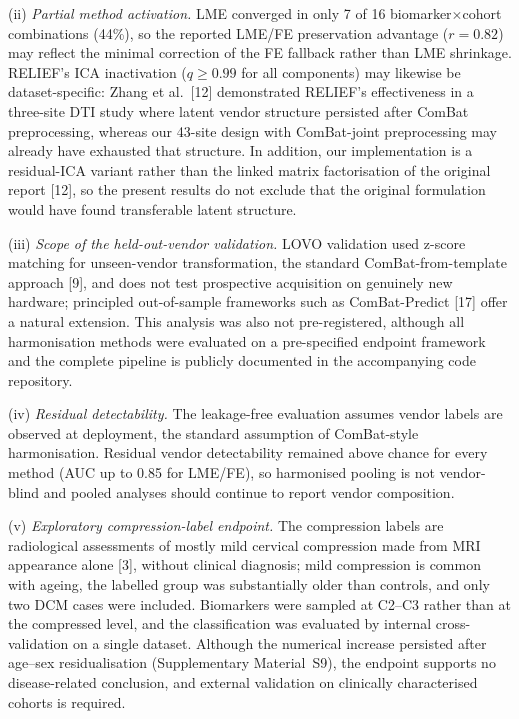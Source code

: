 \documentclass[12pt,a4paper]{article}
\begin{document}
(ii) \emph{Partial method activation.} LME converged in only 7 of 16 biomarker$\times$cohort combinations (44\%), so the reported LME/FE preservation advantage ($r=0.82$) may reflect the minimal correction of the FE fallback rather than LME shrinkage. RELIEF's ICA inactivation ($q\geq0.99$ for all components) may likewise be dataset-specific: Zhang et al.\ [12] demonstrated RELIEF's effectiveness in a three-site DTI study where latent vendor structure persisted after ComBat preprocessing, whereas our 43-site design with ComBat-joint preprocessing may already have exhausted that structure. In addition, our implementation is a residual-ICA variant rather than the linked matrix factorisation of the original report [12], so the present results do not exclude that the original formulation would have found transferable latent structure.

(iii) \emph{Scope of the held-out-vendor validation.} LOVO validation used z-score matching for unseen-vendor transformation, the standard ComBat-from-template approach [9], and does not test prospective acquisition on genuinely new hardware; principled out-of-sample frameworks such as ComBat-Predict [17] offer a natural extension. This analysis was also not pre-registered, although all harmonisation methods were evaluated on a pre-specified endpoint framework and the complete pipeline is publicly documented in the accompanying code repository.

(iv) \emph{Residual detectability.} The leakage-free evaluation assumes vendor labels are observed at deployment, the standard assumption of ComBat-style harmonisation. Residual vendor detectability remained above chance for every method (AUC up to 0.85 for LME/FE), so harmonised pooling is not vendor-blind and pooled analyses should continue to report vendor composition.

(v) \emph{Exploratory compression-label endpoint.} The compression labels are radiological assessments of mostly mild cervical compression made from MRI appearance alone [3], without clinical diagnosis; mild compression is common with ageing, the labelled group was substantially older than controls, and only two DCM cases were included. Biomarkers were sampled at C2--C3 rather than at the compressed level, and the classification was evaluated by internal cross-validation on a single dataset. Although the numerical increase persisted after age--sex residualisation (Supplementary Material~S9), the endpoint supports no disease-related conclusion, and external validation on clinically characterised cohorts is required.
\end{document}
